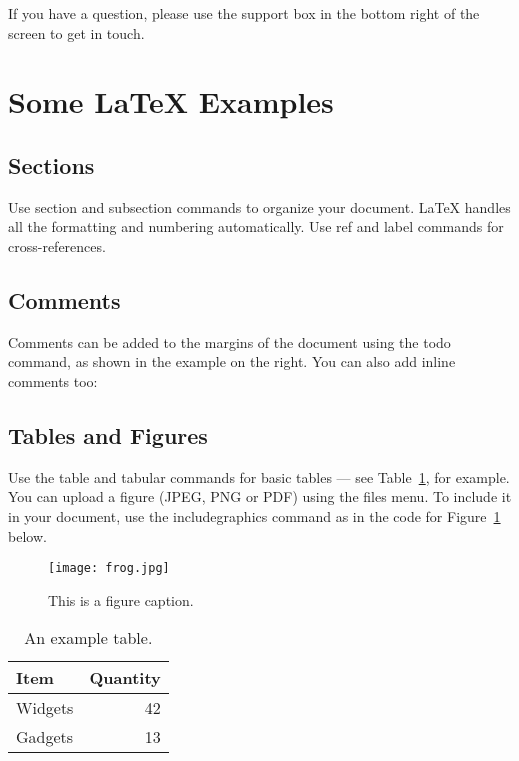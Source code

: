 \documentclass[12pt]{article}
\begin{document}
If you have a question, please use the support box in the bottom right of the screen to get in touch. 

\section{Some \LaTeX{} Examples}
\label{sec:examples}

\subsection{Sections}

Use section and subsection commands to organize your document. \LaTeX{} handles all the formatting and numbering automatically. Use ref and label commands for cross-references.



\subsection{Comments}

Comments can be added to the margins of the document using the  todo command, as shown in the example on the right. You can also add inline comments too:


\subsection{Tables and Figures}

Use the table and tabular commands for basic tables --- see Table~\ref{tab:widgets}, for example. You can upload a figure (JPEG, PNG or PDF) using the files menu. To include it in your document, use the includegraphics command as in the code for Figure~\ref{fig:frog} below.

\begin{figure}
\centering
\texttt{[image: frog.jpg]}
\caption{\label{fig:frog}This is a figure caption.}
\end{figure}

\begin{table}
\centering
\begin{tabular}{l|r}
Item & Quantity \\\hline
Widgets & 42 \\
Gadgets & 13
\end{tabular}
\caption{\label{tab:widgets}An example table.}
\end{table}
\end{document}
